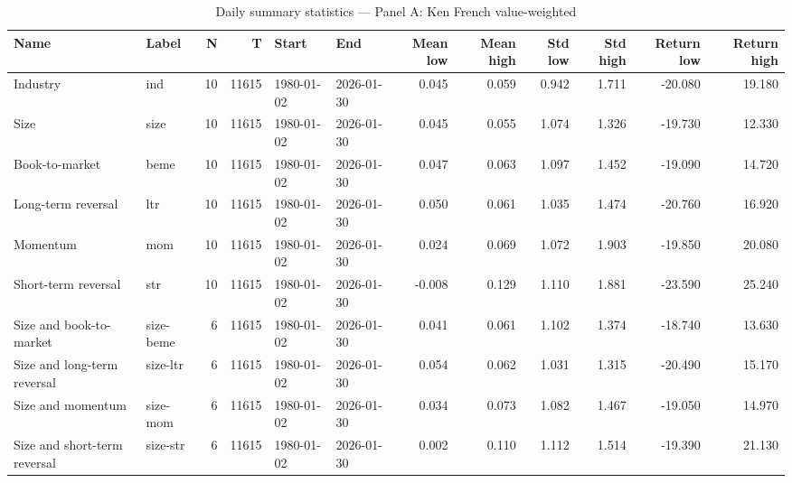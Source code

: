 \begin{table}
\caption{Daily summary statistics --- Panel A: Ken French value-weighted}
\label{tab:summary_a}
\begin{tabular}{llrrllrrrrrr}
\toprule
Name & Label & N & T & Start & End & Mean low & Mean high & Std low & Std high & Return low & Return high \\
\midrule
Industry & ind & 10 & 11615 & 1980-01-02 & 2026-01-30 & 0.045 & 0.059 & 0.942 & 1.711 & -20.080 & 19.180 \\
Size & size & 10 & 11615 & 1980-01-02 & 2026-01-30 & 0.045 & 0.055 & 1.074 & 1.326 & -19.730 & 12.330 \\
Book-to-market & beme & 10 & 11615 & 1980-01-02 & 2026-01-30 & 0.047 & 0.063 & 1.097 & 1.452 & -19.090 & 14.720 \\
Long-term reversal & ltr & 10 & 11615 & 1980-01-02 & 2026-01-30 & 0.050 & 0.061 & 1.035 & 1.474 & -20.760 & 16.920 \\
Momentum & mom & 10 & 11615 & 1980-01-02 & 2026-01-30 & 0.024 & 0.069 & 1.072 & 1.903 & -19.850 & 20.080 \\
Short-term reversal & str & 10 & 11615 & 1980-01-02 & 2026-01-30 & -0.008 & 0.129 & 1.110 & 1.881 & -23.590 & 25.240 \\
Size and book-to-market & size-beme & 6 & 11615 & 1980-01-02 & 2026-01-30 & 0.041 & 0.061 & 1.102 & 1.374 & -18.740 & 13.630 \\
Size and long-term reversal & size-ltr & 6 & 11615 & 1980-01-02 & 2026-01-30 & 0.054 & 0.062 & 1.031 & 1.315 & -20.490 & 15.170 \\
Size and momentum & size-mom & 6 & 11615 & 1980-01-02 & 2026-01-30 & 0.034 & 0.073 & 1.082 & 1.467 & -19.050 & 14.970 \\
Size and short-term reversal & size-str & 6 & 11615 & 1980-01-02 & 2026-01-30 & 0.002 & 0.110 & 1.112 & 1.514 & -19.390 & 21.130 \\
\bottomrule
\end{tabular}
\end{table}


